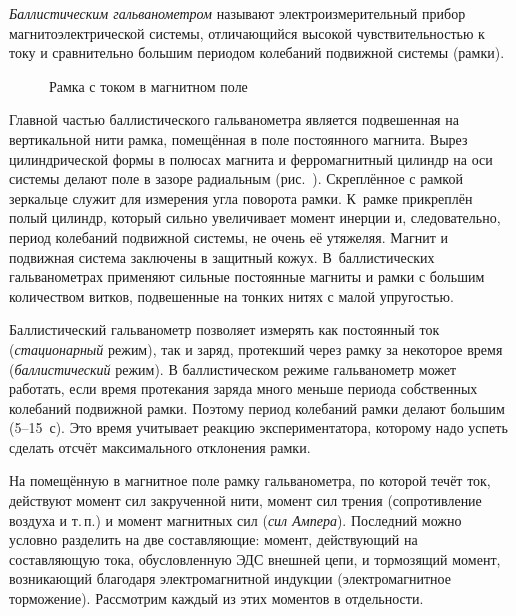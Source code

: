\label{lab:galvanometr}



\emph{Баллистическим гальванометром} называют электроизмерительный прибор
магнитоэлектрической системы, отличающийся высокой чувствительностью к
току и сравнительно большим периодом колебаний подвижной системы
(рамки).

\begin{wrapfigure}[14]{o}{0.33\textwidth}
    \centering
    \vspace*{-\baselineskip}
    \caption{Рамка с током в магнитном поле}
\end{wrapfigure}

Главной частью баллистического гальванометра является подвешенная на
вертикальной нити рамка, помещённая в поле постоянного магнита. Вырез
цилиндрической формы в полюсах магнита и ферромагнитный цилиндр на оси
системы делают поле в зазоре радиальным (рис.~). 
Скреплённое с рамкой
зеркальце служит для измерения угла поворота рамки. К~рамке прикреплён
полый цилиндр, который сильно увеличивает момент инерции и,
следовательно, период колебаний подвижной системы, не очень её утяжеляя.
Магнит и подвижная система заключены в защитный кожух. В~баллистических
гальванометрах применяют сильные постоянные магниты и рамки с большим
количеством витков, подвешенные на тонких нитях с малой упругостью.

Баллистический гальванометр позволяет измерять как постоянный ток
(\emph{стационарный} режим), так и заряд, протекший через рамку за некоторое
время (\emph{баллистический} режим). В баллистическом режиме гальванометр может
работать, если время протекания заряда много меньше периода собственных
колебаний подвижной рамки. Поэтому период колебаний рамки делают большим
(5--15~с). Это время учитывает реакцию экспериментатора, которому надо
успеть сделать отсчёт максимального отклонения рамки.

На помещённую в магнитное поле рамку гальванометра, по которой течёт ток, 
действуют момент сил закрученной нити, момент сил трения (сопротивление
воздуха и т.\,п.) и момент магнитных сил (\emph{сил Ампера}).
Последний можно условно разделить на две составляющие: момент, действующий
на составляющую тока, обусловленную ЭДС внешней цепи, и тормозящий момент,
возникающий благодаря электромагнитной индукции (электромагнитное торможение). 
Рассмотрим каждый из этих моментов в отдельности.


